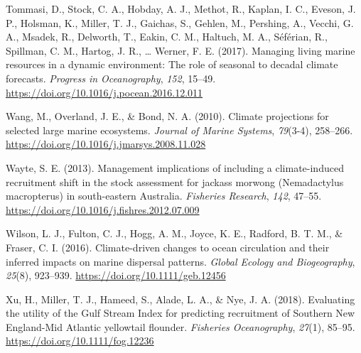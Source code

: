 \documentclass[
  12pt,
]{article}
\newlength{\cslhangindent}
\newenvironment{CSLReferences}[2] %
 {\begin{list}{}{%
  \setlength{\itemindent}{0pt}
  \setlength{\leftmargin}{0pt}
  \setlength{\parsep}{0pt}
  \ifodd #1
   \setlength{\leftmargin}{\cslhangindent}
   \setlength{\itemindent}{-1\cslhangindent}
  \fi
  \setlength{\itemsep}{#2\baselineskip}}}
 {\end{list}}
\begin{document}
\begin{CSLReferences}{1}{2}
Tommasi, D., Stock, C. A., Hobday, A. J., Methot, R., Kaplan, I. C., Eveson, J. P., Holsman, K., Miller, T. J., Gaichas, S., Gehlen, M., Pershing, A., Vecchi, G. A., Msadek, R., Delworth, T., Eakin, C. M., Haltuch, M. A., Séférian, R., Spillman, C. M., Hartog, J. R., \ldots{} Werner, F. E. (2017). Managing living marine resources in a dynamic environment: {The} role of seasonal to decadal climate forecasts. \emph{Progress in Oceanography}, \emph{152}, 15--49. \url{https://doi.org/10.1016/j.pocean.2016.12.011}

Wang, M., Overland, J. E., \& Bond, N. A. (2010). Climate projections for selected large marine ecosystems. \emph{Journal of Marine Systems}, \emph{79}(3-4), 258--266. \url{https://doi.org/10.1016/j.jmarsys.2008.11.028}

Wayte, S. E. (2013). Management implications of including a climate-induced recruitment shift in the stock assessment for jackass morwong ({Nemadactylus} macropterus) in south-eastern {Australia}. \emph{Fisheries Research}, \emph{142}, 47--55. \url{https://doi.org/10.1016/j.fishres.2012.07.009}

Wilson, L. J., Fulton, C. J., Hogg, A. M., Joyce, K. E., Radford, B. T. M., \& Fraser, C. I. (2016). Climate{-}driven changes to ocean circulation and their inferred impacts on marine dispersal patterns. \emph{Global Ecology and Biogeography}, \emph{25}(8), 923--939. \url{https://doi.org/10.1111/geb.12456}

Xu, H., Miller, T. J., Hameed, S., Alade, L. A., \& Nye, J. A. (2018). Evaluating the utility of the {Gulf Stream Index} for predicting recruitment of {Southern New England}-{Mid Atlantic} yellowtail flounder. \emph{Fisheries Oceanography}, \emph{27}(1), 85--95. \url{https://doi.org/10.1111/fog.12236}

\end{CSLReferences}
\end{document}
